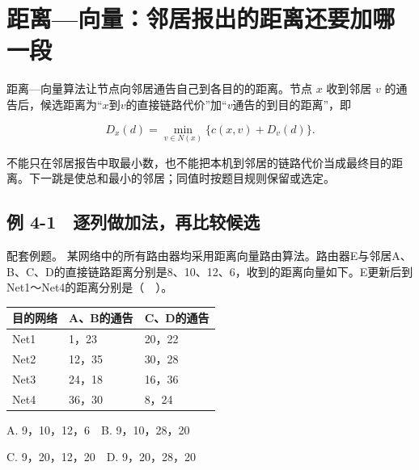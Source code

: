 \section{距离---向量：邻居报出的距离还要加哪一段}\label{CN04-05}

距离---向量算法让节点向邻居通告自己到各目的的距离。节点 \(x\) 收到邻居 \(v\) 的通告后，候选距离为``\(x\)到\(v\)的直接链路代价''加``\(v\)通告的到目的距离''，即

\[D_x(d)=\min_{v\in N(x)}\{c(x,v)+D_v(d)\}.\]

不能只在邻居报告中取最小数，也不能把本机到邻居的链路代价当成最终目的距离。下一跳是使总和最小的邻居；同值时按题目规则保留或选定。

\subsection{例 4-1　逐列做加法，再比较候选}\label{CN04-ex1}

\begin{example}[配套例题]

配套例题。 某网络中的所有路由器均采用距离向量路由算法。路由器E与邻居A、B、C、D的直接链路距离分别是8、10、12、6，收到的距离向量如下。E更新后到Net1～Net4的距离分别是（　）。

\begin{wideblock}

\par\medskip\noindent\begin{minipage}{\linewidth}\fontsize{9.3}{12}\selectfont\begin{tabularx}{\linewidth}{@{}YYY@{}}
\toprule\noalign{}
目的网络 & A、B的通告 & C、D的通告 \\
\midrule\noalign{}


Net1 & 1，23 & 20，22 \\
Net2 & 12，35 & 30，28 \\
Net3 & 24，18 & 16，36 \\
Net4 & 36，30 & 8，24 \\
\bottomrule\end{tabularx}
\end{minipage}\par\medskip

\end{wideblock}

A. 9，10，12，6　B. 9，10，28，20

C. 9，20，12，20　D. 9，20，28，20

\end{example}

